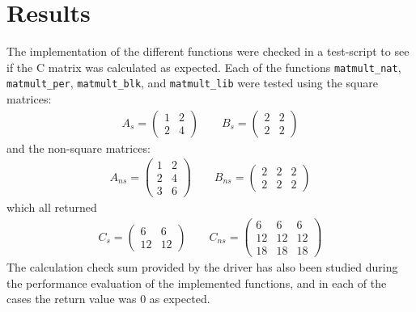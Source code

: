 \section{Results}
The implementation of the different functions were checked in a test-script to see if the C matrix was calculated as expected. Each of the functions \texttt{matmult\_nat}, \texttt{matmult\_per}, \texttt{matmult\_blk}, and \texttt{matmult\_lib} were tested using the square matrices:
\begin{align*}
    A_s = 
    \begin{pmatrix}
        1 & 2\\
        2 & 4
    \end{pmatrix} \qquad
    B_s =
    \begin{pmatrix}
        2 & 2\\
        2 & 2
    \end{pmatrix}
\end{align*}
and the non-square matrices:
\begin{align*}
    A_{ns} = 
    \begin{pmatrix}
        1 & 2\\
        2 & 4\\
        3 & 6
    \end{pmatrix} \qquad
    B_{ns} =
    \begin{pmatrix}
        2 & 2 & 2\\
        2 & 2 & 2
    \end{pmatrix}
\end{align*}
which all returned
\begin{align*}
    C_{s} = 
    \begin{pmatrix}
        6 & 6\\
        12 & 12
    \end{pmatrix} \qquad
    C_{ns} = 
    \begin{pmatrix}
        6 & 6 & 6\\
        12 & 12 & 12\\
        18 & 18 & 18
    \end{pmatrix}
\end{align*}
The calculation check sum provided by the driver has also been studied during the performance evaluation of the implemented functions, and in each of the cases the return value was 0 as expected.  

